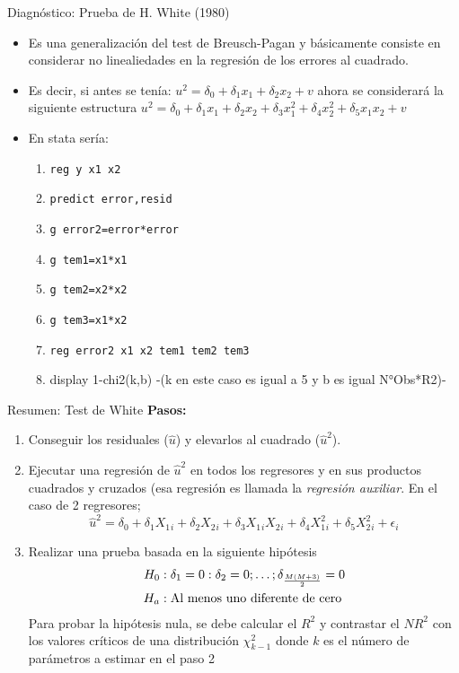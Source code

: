 \begin{frame}{Diagnóstico: Prueba de H. White (1980)}
	\begin{itemize}
		\item Es una generalización del test de Breusch-Pagan y básicamente consiste en considerar no linealiedades en la regresión de los errores al cuadrado.
		\pause
		\item Es decir, si antes se tenía: $u^{2}=\delta_{0}+\delta_{1}x_{1}+\delta_{2}x_{2}+v$ ahora se considerará la siguiente estructura $u^{2}=\delta_{0}+\delta_{1}x_{1}+\delta_{2}x_{2}+\delta_{3}x_{1}^{2}+\delta_{4}x_{2}^{2}+\delta_{5}x_{1}x_{2}+v$
		\pause
		\item En stata sería:
			\begin{enumerate}
				\item \colorbox{codegray}{\texttt{\textcolor{codeblue}{reg} y x1 x2}}
				\item \colorbox{codegray}{\texttt{\textcolor{codeblue}{predict error},resid}}
				\item \colorbox{codegray}{\texttt{\textcolor{codeblue}{g} error2=\textcolor{codeblue}{error}*\textcolor{codeblue}{error}}}
				\item \colorbox{codegray}{\texttt{\textcolor{codeblue}{g} tem1=x1*x1}}
				\item \colorbox{codegray}{\texttt{\textcolor{codeblue}{g} tem2=x2*x2}}
				\item \colorbox{codegray}{\texttt{\textcolor{codeblue}{g} tem3=x1*x2}}
				\item \colorbox{codegray}{\texttt{\textcolor{codeblue}{reg} error2 x1 x2 tem1 tem2 tem3}}
				\item display 1-chi2(k,b) -(k en este caso es igual a 5 y b es igual N°Obs*R2)-
			\end{enumerate}
	\end{itemize}
\end{frame}
\begin{frame}{Resumen: Test de White}
	\textbf{Pasos:}
		\begin{enumerate}
			\item Conseguir los residuales ($\hat{u}$) y elevarlos al cuadrado ($\hat{u}^2$).
			\item Ejecutar una regresión de $\hat{u}^2$ en todos los regresores y en sus productos cuadrados y cruzados (esa regresión es llamada la \emph{regresión auxiliar}. En el caso de 2 regresores;
					$$\hat{u}^2 = \delta_0 + \delta_1 X_1{}_i + \delta_2 X_2{}_i + \delta_3 X_1{}_i X_2{}_i + \delta_4 X^2_1{}_i + \delta_5 X^2_2{}_i + \epsilon_i$$
			\item Realizar una prueba basada en la siguiente hipótesis
				\begin{align*}
					H_0 & : \delta_1=0: \delta_2=0;\dots; \delta_{\frac{M(M+3)}{2}}=0\\
					H_a & : \textup{Al menos uno diferente de cero}
				\end{align*}
			Para probar la hipótesis nula, se debe calcular el $R^2$ y contrastar el $NR^2$ con los valores críticos de una distribución $\chi{^2_{k-1}}$ donde $k$ es el número de parámetros a estimar en el paso 2
		\end{enumerate}
\end{frame}
